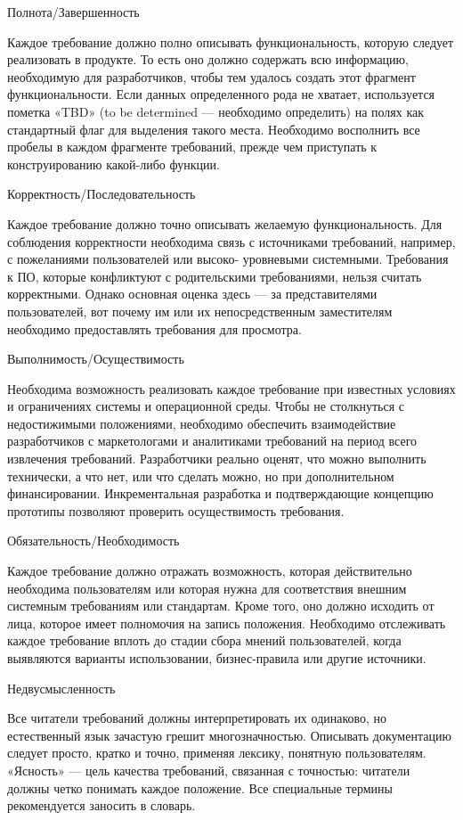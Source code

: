 \documentclass{../industrial-development}
\begin{document}
\alert{Полнота/Завершенность}

Каждое требование должно полно описывать функциональность, которую следует реализовать в продукте. То есть оно должно содержать
всю информацию, необходимую для разработчиков, чтобы тем удалось создать этот фрагмент функциональности. Если данных определенного рода не хватает, используется пометка «TBD» (to be determined — необходимо определить) на полях как стандартный флаг для выделения такого места. Необходимо восполнить все пробелы в каждом фрагменте требований, прежде чем приступать к конструированию какой-либо функции.

\alert{Корректность/Последовательность}

Каждое требование должно точно описывать желаемую функциональность. Для соблюдения корректности необходима связь с источниками требований, например, с пожеланиями пользователей или высоко-
уровневыми системными. Требования к ПО, которые конфликтуют с родительскими требованиями, нельзя считать корректными. Однако основная оценка здесь — за представителями пользователей, вот почему им или их непосредственным заместителям необходимо предоставлять требования для просмотра.

\alert{Выполнимость/Осуществимость}

Необходима возможность реализовать каждое требование при известных условиях и ограничениях системы и операционной среды.
Чтобы не столкнуться с недостижимыми положениями, необходимо обеспечить взаимодействие разработчиков с маркетологами и аналитиками требований
на период всего извлечения требований. Разработчики реально оценят, что можно выполнить технически, а что нет, или что сделать можно, но при дополнительном финансировании. Инкрементальная разработка и подтверждающие концепцию прототипы позволяют проверить осуществимость требования.

\alert{Обязательность/Необходимость}

Каждое требование должно отражать возможность, которая действительно необходима пользователям или которая нужна для соответствия внешним системным требованиям или стандартам. Кроме того,
оно должно исходить от лица, которое имеет полномочия на запись положения. Необходимо отслеживать каждое требование вплоть до стадии сбора
мнений пользователей, когда выявляются варианты использовании, бизнес-правила или другие источники.

\alert{Недвусмысленность}

Все читатели требований должны интерпретировать их одинаково, но естественный язык зачастую грешит многозначностью. Описывать документацию следует просто, кратко и точно, применяя лексику, понятную пользователям. «Ясность» — цель качества требований, связанная с точностью: читатели должны четко понимать каждое положение. Все специальные термины рекомендуется заносить в словарь.
\end{document}
